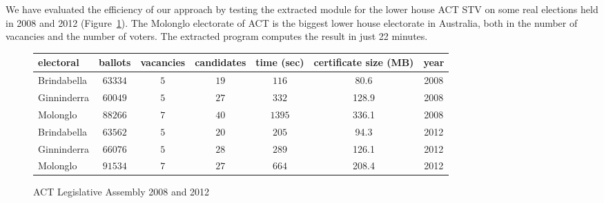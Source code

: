 \documentclass{llncs}
\begin{document}
 
 We have evaluated the efficiency of our approach by testing the
 extracted module for the lower house ACT STV on some real elections
 held in 2008
 and 2012 (Figure~\ref{ref;figure6}). The Molonglo
 electorate of ACT is the biggest lower house electorate in
 Australia, both in the number of vacancies and the number of voters. The extracted
 program computes the result in just 22 minutes.  \begin{small}
\begin{figure}[h]
\centering
\begin{tabular}{|l |c |c |c |c |c|c|}
\hline
electoral & ballots& vacancies& candidates& time (sec)& certificate size (MB)&year\\
\hline
Brindabella &$63334$&$5$&$19$&$116$&80.6&2008\\
Ginninderra &$60049$&$5$&$27$&$332$&128.9&2008\\
Molonglo &$88266$&$7$&$40$&$1395$&336.1&2008\\
Brindabella&$63562$&$5$&$20$&$205$&94.3&2012\\
Ginninderra&$66076$&$5$&$28$&$289$&126.1&2012\\
Molonglo&$91534$&$7$&$27$&$664$&208.4&2012\\
\hline
\end{tabular}
\caption{ACT Legislative Assembly 2008 and 2012}
\label{ref;figure6}
\end{figure}
\end{small}  
\end{document}
